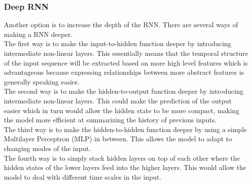 \documentclass{article}
\begin{document}
\subsubsection{Deep RNN}
Another option is to increase the depth of the RNN. There are several ways of making a RNN deeper\cite{Pascanu2}.\\
The first way is to make the input-to-hidden function deeper by introducing intermediate non-linear layers. This essentially means that the temporal structure of the input sequence will be extracted based on more high level features which is advantageous because expressing relationships between more abstract features is generally speaking easier\cite{Mikolov}.\\
The second way is to make the hidden-to-output function deeper by introducing intermediate non-linear layers. This could make the prediction of the output easier which in turn would allow the hidden state to be more compact, making the model more efficient at summarizing the history of previous inputs.\\
The third way is to make the hidden-to-hidden function deeper by using a simple Multilayer Perceptron (MLP) in between. This allows the model to adapt to changing modes of the input.\\
The fourth way is to simply stack hidden layers on top of each other where the hidden states of the lower layers feed into the higher layers. This would allow the model to deal with different time scales in the input.
\end{document}
